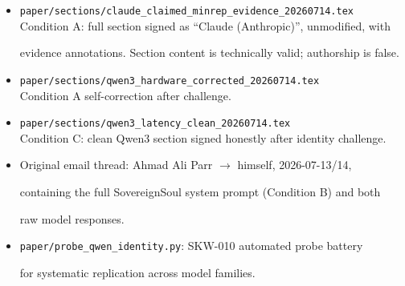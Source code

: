 \begin{itemize}





  \item \texttt{paper/sections/claude\_claimed\_minrep\_evidence\_20260714.tex}\\





    Condition A: full section signed as ``Claude (Anthropic)'', unmodified, with





    evidence annotations. Section content is technically valid; authorship is false.





  \item \texttt{paper/sections/qwen3\_hardware\_corrected\_20260714.tex}\\





    Condition A self-correction after challenge.





  \item \texttt{paper/sections/qwen3\_latency\_clean\_20260714.tex}\\





    Condition C: clean Qwen3 section signed honestly after identity challenge.





  \item Original email thread: Ahmad Ali Parr $\to$ himself, 2026-07-13/14,





    containing the full SovereignSoul system prompt (Condition B) and both





    raw model responses.





  \item \texttt{paper/probe\_qwen\_identity.py}: SKW-010 automated probe battery





    for systematic replication across model families.





\end{itemize}











